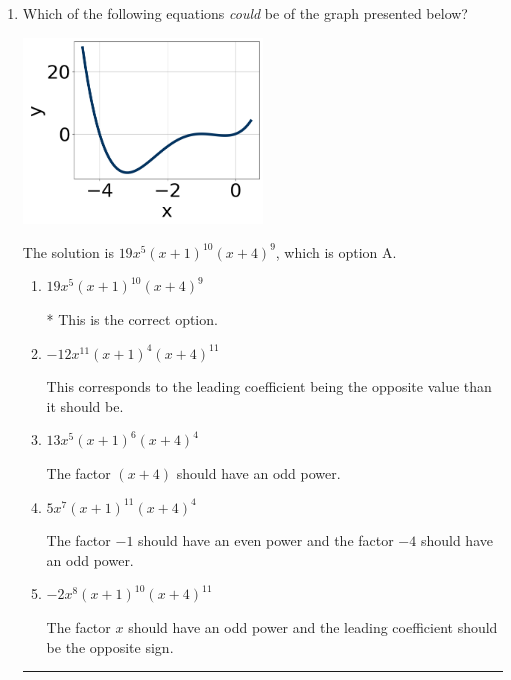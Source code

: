 \documentclass{extbook}[14pt]
\newcommand{\litem}[1]{\item #1

\rule{\textwidth}{0.4pt}}
\begin{document}
\begin{enumerate}\litem{
Which of the following equations \textit{could} be of the graph presented below?

\begin{center}
    \includegraphics[width=0.5\textwidth]{../Figures/polyGraphToFunctionCopyB.png}
\end{center}


The solution is \( 19x^{5} (x + 1)^{10} (x + 4)^{9} \), which is option A.\begin{enumerate}[label=\Alph*.]
\item \( 19x^{5} (x + 1)^{10} (x + 4)^{9} \)

* This is the correct option.
\item \( -12x^{11} (x + 1)^{4} (x + 4)^{11} \)

This corresponds to the leading coefficient being the opposite value than it should be.
\item \( 13x^{5} (x + 1)^{6} (x + 4)^{4} \)

The factor $(x + 4)$ should have an odd power.
\item \( 5x^{7} (x + 1)^{11} (x + 4)^{4} \)

The factor $-1$ should have an even power and the factor $-4$ should have an odd power.
\item \( -2x^{8} (x + 1)^{10} (x + 4)^{11} \)

The factor $x$ should have an odd power and the leading coefficient should be the opposite sign.
\end{enumerate}

}
\end{enumerate}
\end{document}
